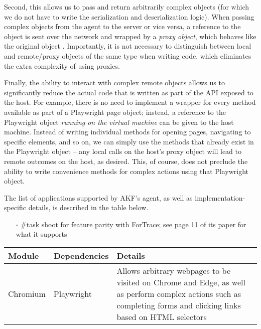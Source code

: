 \documentclass[letterpaper,12pt]{report}
\def\tightlist{}
\begin{document}
Second, this allows us to pass and return arbitrarily complex objects
(for which we do not have to write the serialization and deserialization
logic). When passing complex objects from the agent to the server or
vice versa, a reference to the object is sent over the network and
wrapped by a \emph{proxy object}, which behaves like the original object
\cite{TheoryOperationRPyC}. Importantly, it is not necessary to
distinguish between local and remote/proxy objects of the same type when
writing code, which eliminates the extra complexity of using proxies.

Finally, the ability to interact with complex remote objects allows us
to significantly reduce the actual code that is written as part of the
API exposed to the host. For example, there is no need to implement a
wrapper for every method available as part of a Playwright page object;
instead, a reference to the Playwright object \emph{running on the
virtual machine} can be given to the host machine. Instead of writing
individual methods for opening pages, navigating to specific elements,
and so on, we can simply use the methods that already exist in the
Playwright object -- any local calls on the host's proxy object will
lead to remote outcomes on the host, as desired. This, of course, does
not preclude the ability to write convenience methods for complex
actions using that Playwright object.

The list of applications supported by AKF's agent, as well as
implementation-specific details, is described in the table below.

\begin{itemize}
\tightlist
\item[$\square$]
  \#task shoot for feature parity with ForTrace; see page 11 of its
  paper for what it supports
\end{itemize}

\begin{longtable}[]{@{}
  >{\raggedright\arraybackslash}p{}
  >{\raggedright\arraybackslash}p{}
  >{\raggedright\arraybackslash}p{}@{}}
\toprule\noalign{}
\begin{minipage}[b]{\linewidth}\raggedright
Module
\end{minipage} & \begin{minipage}[b]{\linewidth}\raggedright
Dependencies
\end{minipage} & \begin{minipage}[b]{\linewidth}\raggedright
Details
\end{minipage} \\
\midrule\noalign{}
\endhead
\bottomrule\noalign{}
\endlastfoot
Chromium & Playwright \cite{MicrosoftPlaywrightpython2025} & Allows
arbitrary webpages to be visited on Chrome and Edge, as well as perform
complex actions such as completing forms and clicking links based on
HTML selectors \\
\end{longtable}
\end{document}
